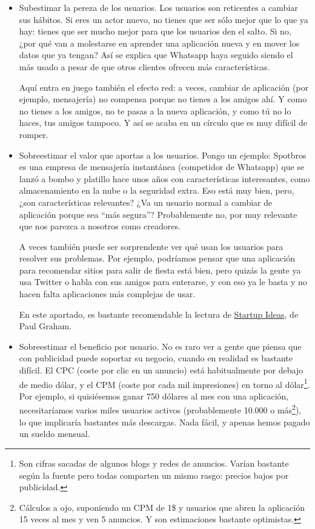\documentclass[nochap,palatino,shortheader]{apuntes}
\begin{document}
\begin{itemize}
\item Subestimar la pereza de los usuarios. Los usuarios son reticentes a cambiar sus hábitos. Si eres un actor nuevo, no tienes que ser sólo mejor que lo que ya hay: tienes que ser mucho mejor para que los usuarios den el salto. Si no, ¿por qué van a molestarse en aprender una aplicación nueva y en mover los datos que ya tengan? Así se explica que Whatsapp haya seguido siendo el más usado a pesar de que otros clientes ofrecen más características.

Aquí entra en juego también el efecto red: a veces, cambiar de aplicación (por ejemplo, mensajería) no compensa porque no tienes a los amigos ahí. Y como no tienes a los amigos, no te pasas a la nueva aplicación, y como tú no lo haces, tus amigos tampoco. Y así se acaba en un círculo que es muy difícil de romper.

\item Sobreestimar el valor que aportas a los usuarios. Pongo un ejemplo: Spotbros es una empresa de mensajería instantánea (competidor de Whatsapp) que se lanzó a bombo y platillo hace unos años con características interesantes, como almacenamiento en la nube o la seguridad extra. Eso está muy bien, pero, ¿son características relevantes? ¿Va un usuario normal a cambiar de aplicación porque sea ``más segura''? Probablemente no, por muy relevante que nos parezca a nosotros como creadores.

A veces también puede ser sorprendente ver qué usan los usuarios para resolver sus problemas. Por ejemplo, podríamos pensar que una aplicación para recomendar sitios para salir de fiesta está bien, pero quizás la gente ya usa Twitter o habla con sus amigos para enterarse, y con eso ya le basta y no hacen falta aplicaciones más complejas de usar.

En este apartado, es bastante recomendable la lectura de \href{http://paulgraham.com/startupideas.html}{Startup Ideas}, de Paul Graham.

\item Sobreestimar el beneficio por usuario. No es raro ver a gente que piensa que con publicidad puede soportar su negocio, cuando en realidad es bastante difícil. El CPC (coste por clic en un anuncio) está habitualmente por debajo de medio dólar, y el CPM (coste por cada mil impresiones) en torno al dólar\footnote{Son cifras sacadas de algunos blogs y redes de anuncios. Varían bastante según la fuente pero todas comparten un mismo rasgo: precios bajos por publicidad.}. Por ejemplo, si quisiésemos ganar 750 dólares al mes con una aplicación, necesitaríamos varios miles usuarios activos (probablemente 10.000 o más\footnote{Cálculos a ojo, suponiendo un CPM de 1\$ y usuarios que abren la aplicación 15 veces al mes y ven 5 anuncios. Y son estimaciones bastante optimistas.}), lo que implicaría bastantes más descargas. Nada fácil, y apenas hemos pagado un sueldo mensual.


\end{itemize}
\end{document}
